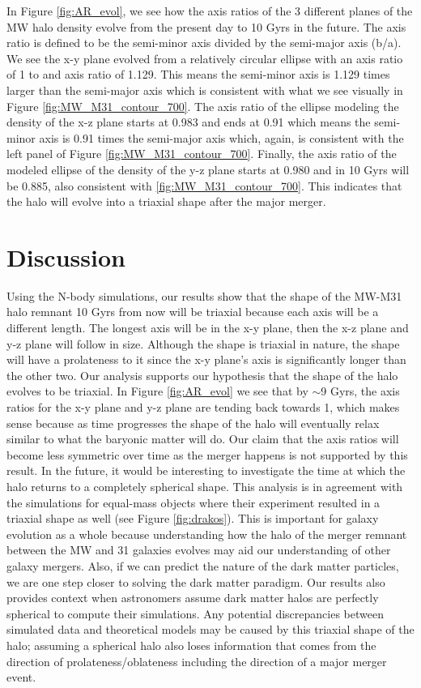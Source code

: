 \documentclass[linenumbers, twocolumn]{aastex631}
\begin{document}
In Figure \ref{fig:AR_evol}, we see how the axis ratios of the 3 different planes of the MW halo density evolve from the present day to 10 Gyrs in the future. The axis ratio is defined to be the semi-minor axis divided by the semi-major axis (b/a). We see the x-y plane evolved from a relatively circular ellipse with an axis ratio of 1 to and axis ratio of 1.129. This means the semi-minor axis is 1.129 times larger than the semi-major axis which is consistent with what we see visually in Figure \ref{fig:MW_M31_contour_700}. The axis ratio of the ellipse modeling the density of the x-z plane starts at 0.983 and ends at 0.91 which means the semi-minor axis is 0.91 times the semi-major axis which, again, is consistent with the left panel of Figure \ref{fig:MW_M31_contour_700}. Finally, the axis ratio of the modeled ellipse of the density of the y-z plane starts at 0.980 and in 10 Gyrs will be 0.885, also consistent with \ref{fig:MW_M31_contour_700}. This indicates that the halo will evolve into a triaxial shape after the major merger.

\section{Discussion}
Using the N-body simulations, our results show that the shape of the MW-M31 halo remnant 10 Gyrs from now will be triaxial because each axis will be a different length. The longest axis will be in the x-y plane, then the x-z plane and y-z plane will follow in size. Although the shape is triaxial in nature, the shape will have a prolateness to it since the x-y plane's axis is significantly longer than the other two.
Our analysis supports our hypothesis that the shape of the halo evolves to be triaxial. In Figure \ref{fig:AR_evol} we see that by $\sim$9 Gyrs, the axis ratios for the x-y plane and y-z plane are tending back towards 1, which makes sense because as time progresses the shape of the halo will eventually relax similar to what the baryonic matter will do. Our claim that the axis ratios will become less symmetric over time as the merger happens is not supported by this result. In the future, it would be interesting to investigate the time at which the halo returns to a completely spherical shape.
This analysis is in agreement with the \cite{2019drakos} simulations for equal-mass objects where their experiment resulted in a triaxial shape as well (see Figure \ref{fig:drakos}).
This is important for galaxy evolution as a whole because understanding how the halo of the merger remnant between the MW and 31 galaxies evolves may aid our understanding of other galaxy mergers. Also, if we can predict the nature of the dark matter particles, we are one step closer to solving the dark matter paradigm. 
Our results also provides context when astronomers assume dark matter halos are perfectly spherical to compute their simulations. Any potential discrepancies between simulated data and theoretical models may be caused by this triaxial shape of the halo; assuming a spherical halo also loses information that comes from the direction of prolateness/oblateness including the direction of a major merger event.
\end{document}
